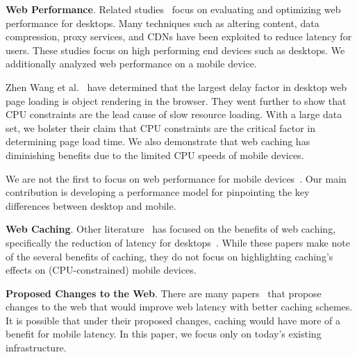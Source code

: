 \textbf{Web Performance}. Related studies~\cite{web-perf-2, web-perf-3} focus on evaluating and optimizing web performance for desktops. Many techniques such as altering content, data compression, proxy services, and CDNs have been exploited to reduce latency for users. These studies focus on high performing end devices such as desktops. We additionally analyzed web performance on a mobile device.

Zhen Wang et al.~\cite{CPU-plt-2, CPU-plt-3} have determined that the largest delay factor in desktop web page loading is object rendering in the browser. They went further to show that CPU constraints are the lead cause of slow resource loading.
With a large data set, we bolster their claim that CPU constraints are the critical factor in determining page load time. We also demonstrate that web caching has diminishing benefits due to the limited CPU speeds of mobile devices.

We are not the first to focus on web performance for mobile
devices~\cite{CPU-plt-2, CPU-plt-3}.
Our main contribution is developing a performance model for pinpointing the key differences between desktop
and mobile.

\textbf{Web Caching}. Other literature~\cite{web-caching-1, web-caching-2, web-caching-8, web-caching-9} has focused on the benefits of web caching, specifically the reduction of latency for desktops~\cite{web-caching-3, web-caching-4, web-caching-5, web-caching-6, web-caching-7}.
While these papers make note of the several benefits of caching, they do not
focus on highlighting caching's effects on (CPU-constrained) mobile devices.


\textbf{Proposed Changes to the Web}. There are many
papers~\cite{web-perf-4-new-design, web-caching-4-new-design,
web-caching-5-new-design, web-caching-latency-1-new-design,
web-caching-latency-2-new-design, web-caching-latency-3-new-design,
web-caching-latency-5-new-design, web-caching-latency-6-new-design,
web-caching-latency-7-new-design} that propose changes to the web that would
improve web latency with better caching schemes. It is possible that under their proposed changes, caching would have more of a benefit for mobile latency. In this paper, we focus only on today's existing infrastructure. %

